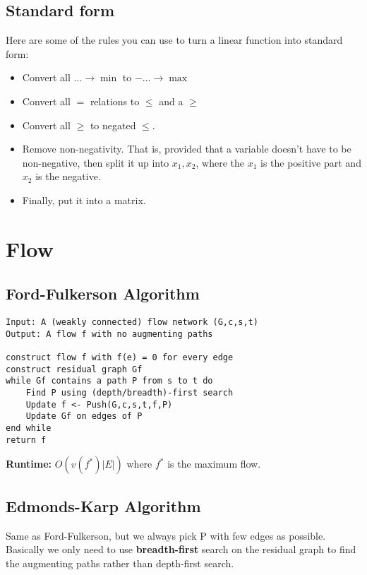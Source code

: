 \documentclass[11pt,fleqn,a4paper,titlepage,dvipsnames,cmyk]{scrartcl}
\begin{document}
\subsection{Standard form}%
\label{sub:Standard form}
Here are some of the rules you can use to turn a linear function into
standard form:
\begin{itemize}
    \item Convert all $\dots \rightarrow \min$ to $-\dots \rightarrow \max$
    \item Convert all $=$ relations to $\le$ and a $\ge$
    \item Convert all $\ge$ to negated $\le$.
    \item Remove non-negativity. That is, provided that a variable doesn't
        have to be non-negative, then split it up into $x_1,x_2$, where
        the $x_1$ is the positive part and $x_2$ is the negative.
    \item Finally, put it into a matrix.
\end{itemize}

\section{Flow}%
\label{sec:Flow}
\subsection{Ford-Fulkerson Algorithm}%
\label{sub:Ford-Fulkerson Algorithm}
\begin{lstlisting}
Input: A (weakly connected) flow network (G,c,s,t)
Output: A flow f with no augmenting paths

construct flow f with f(e) = 0 for every edge
construct residual graph Gf
while Gf contains a path P from s to t do
    Find P using (depth/breadth)-first search
    Update f <- Push(G,c,s,t,f,P)
    Update Gf on edges of P
end while
return f
\end{lstlisting}

\textbf{Runtime:} $O(v(f^*)|E|)$ where $f^*$ is the maximum flow.

\subsection{Edmonds-Karp Algorithm}%
\label{sub:EK}
Same as Ford-Fulkerson, but we always pick P with few edges as possible.
Basically we only need to use \textbf{breadth-first} search on the
residual graph to find the augmenting paths rather than depth-first
search.
\end{document}
